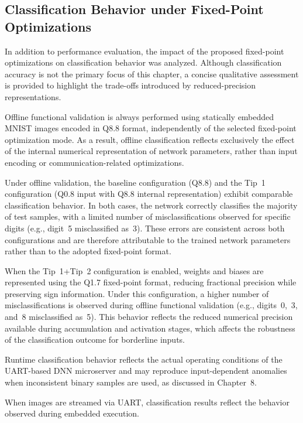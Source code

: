 \subsection{Classification Behavior under Fixed-Point Optimizations}

In addition to performance evaluation, the impact of the proposed fixed-point
optimizations on classification behavior was analyzed.
Although classification accuracy is not the primary focus of this chapter, a
concise qualitative assessment is provided to highlight the trade-offs introduced
by reduced-precision representations.

Offline functional validation is always performed using statically embedded
MNIST images encoded in Q8.8 format, independently of the selected fixed-point
optimization mode.
As a result, offline classification reflects exclusively the effect of the
internal numerical representation of network parameters, rather than input
encoding or communication-related optimizations.


Under offline validation, the baseline configuration (Q8.8) and the Tip~1
configuration (Q0.8 input with Q8.8 internal representation) exhibit comparable
classification behavior.
In both cases, the network correctly classifies the majority of test samples,
with a limited number of misclassifications observed for specific digits
(e.g., digit~5 misclassified as~3).
These errors are consistent across both configurations and are therefore
attributable to the trained network parameters rather than to the adopted
fixed-point format.

When the Tip~1+Tip~2 configuration is enabled, weights and biases are represented
using the Q1.7 fixed-point format, reducing fractional precision while preserving
sign information.
Under this configuration, a higher number of misclassifications is observed
during offline functional validation (e.g., digits~0,~3, and~8 misclassified as~5).
This behavior reflects the reduced numerical precision available during
accumulation and activation stages, which affects the robustness of the
classification outcome for borderline inputs.

Runtime classification behavior reflects the actual operating conditions of the
UART-based DNN microserver and may reproduce input-dependent anomalies when
inconsistent binary samples are used, as discussed in Chapter~8.

When images are streamed via UART, classification results reflect the behavior
observed during embedded execution.

